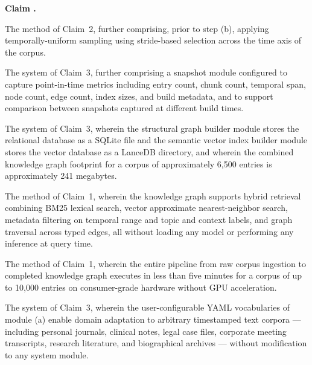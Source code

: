 \documentclass[12pt,letterpaper]{article}
\newcounter{claimnum}
\newenvironment{claims}
  {\begin{list}{\textbf{Claim \arabic{claimnum}.}}
      {\usecounter{claimnum}
       \setlength{\labelwidth}{1.8cm}
       \setlength{\labelsep}{0.4cm}
       \setlength{\leftmargin}{2.2cm}
       \setlength{\itemsep}{12pt}
       \setlength{\parsep}{4pt}}}
  {\end{list}}
\begin{document}
\begin{claims}
\item The method of Claim~2, further comprising, prior to step (b), applying
temporally-uniform sampling using stride-based selection across the time axis of the
corpus.

\item The system of Claim~3, further comprising a snapshot module configured to capture
point-in-time metrics including entry count, chunk count, temporal span, node count,
edge count, index sizes, and build metadata, and to support comparison between snapshots
captured at different build times.

\item The system of Claim~3, wherein the structural graph builder module stores the
relational database as a SQLite file and the semantic vector index builder module stores
the vector database as a LanceDB directory, and wherein the combined knowledge graph
footprint for a corpus of approximately 6,500 entries is approximately 241 megabytes.

\item The method of Claim~1, wherein the knowledge graph supports hybrid retrieval
combining BM25 lexical search, vector approximate nearest-neighbor search, metadata
filtering on temporal range and topic and context labels, and graph traversal across
typed edges, all without loading any model or performing any inference at query time.

\item The method of Claim~1, wherein the entire pipeline from raw corpus ingestion to
completed knowledge graph executes in less than five minutes for a corpus of up to
10,000 entries on consumer-grade hardware without GPU acceleration.

\item The system of Claim~3, wherein the user-configurable YAML vocabularies of module
(a) enable domain adaptation to arbitrary timestamped text corpora --- including
personal journals, clinical notes, legal case files, corporate meeting transcripts,
research literature, and biographical archives --- without modification to any system
module.

\end{claims}
\end{document}
